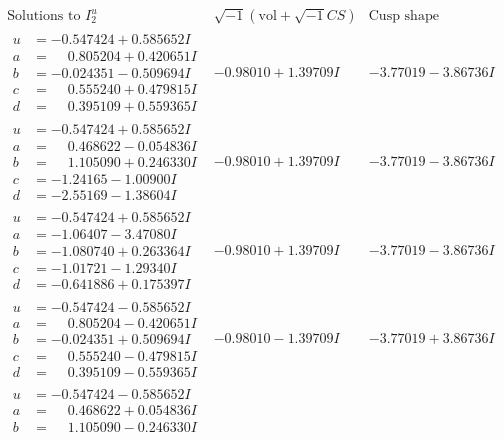 \documentclass[1p]{elsarticle_modified}
\theoremstyle{definition}
\newcommand{\I}{\sqrt{-1}}
\begin{document}
$$\begin{array}{c|c|c}  
\text{Solutions to }I^u_{2}& \I (\text{vol} + \sqrt{-1}CS) & \text{Cusp shape}\\
 \hline 
\begin{aligned}
u &= -0.547424 + 0.585652 I \\
a &= \phantom{-}0.805204 + 0.420651 I \\
b &= -0.024351 - 0.509694 I \\
c &= \phantom{-}0.555240 + 0.479815 I \\
d &= \phantom{-}0.395109 + 0.559365 I\end{aligned}
 & -0.98010 + 1.39709 I & -3.77019 - 3.86736 I \\ \hline\begin{aligned}
u &= -0.547424 + 0.585652 I \\
a &= \phantom{-}0.468622 - 0.054836 I \\
b &= \phantom{-}1.105090 + 0.246330 I \\
c &= -1.24165 - 1.00900 I \\
d &= -2.55169 - 1.38604 I\end{aligned}
 & -0.98010 + 1.39709 I & -3.77019 - 3.86736 I \\ \hline\begin{aligned}
u &= -0.547424 + 0.585652 I \\
a &= -1.06407 - 3.47080 I \\
b &= -1.080740 + 0.263364 I \\
c &= -1.01721 - 1.29340 I \\
d &= -0.641886 + 0.175397 I\end{aligned}
 & -0.98010 + 1.39709 I & -3.77019 - 3.86736 I \\ \hline\begin{aligned}
u &= -0.547424 - 0.585652 I \\
a &= \phantom{-}0.805204 - 0.420651 I \\
b &= -0.024351 + 0.509694 I \\
c &= \phantom{-}0.555240 - 0.479815 I \\
d &= \phantom{-}0.395109 - 0.559365 I\end{aligned}
 & -0.98010 - 1.39709 I & -3.77019 + 3.86736 I \\ \hline\begin{aligned}
u &= -0.547424 - 0.585652 I \\
a &= \phantom{-}0.468622 + 0.054836 I \\
b &= \phantom{-}1.105090 - 0.246330 I \\

\end{aligned}
\end{array}$$
\end{document}
